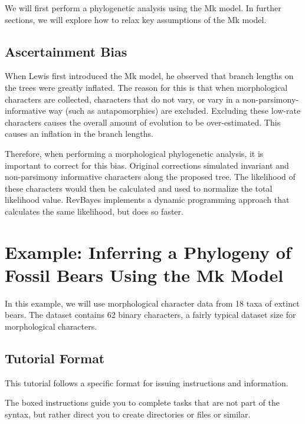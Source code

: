 We will first perform a phylogenetic analysis using the Mk model.
In further sections, we will explore how to relax key assumptions of the Mk model. \par

\subsection{Ascertainment Bias}

When Lewis first introduced the Mk model, he observed that branch lengths on the trees were greatly inflated.
The reason for this is that when morphological characters are collected, characters that do not vary, or vary in a non-parsimony-informative way (such as autapomorphies) are excluded.
Excluding these low-rate characters causes the overall amount of evolution to be over-estimated.
This causes an inflation in the branch lengths. \par

Therefore, when performing a morphological phylogenetic analysis, it is important to correct for this bias.
Original corrections simulated invariant and non-parsimony informative characters along the proposed tree.
The likelihood of these characters would then be calculated and used to normalize the total likelihood value.
RevBayes implements a dynamic programming approach that calculates the same likelihood, but  does so faster. \par

\section{Example: Inferring a Phylogeny of Fossil Bears Using the Mk Model}

In this example, we will use morphological character data from 18 taxa of extinct bears. 
The dataset contains 62 binary characters, a fairly typical dataset size for morphological characters. \par

\medskip
\subsection{Tutorial Format}\label{subsect:Exercise-Format}

This tutorial follows a specific format for issuing instructions and information.

{\begin{framed}
The boxed instructions guide you to complete tasks that are not part of the \RevBayes syntax, but rather direct you to create directories or files or similar.
\end{framed}}



